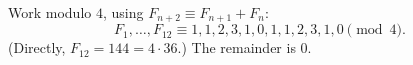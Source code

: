 Work modulo $4$, using $F_{n+2}\equiv F_{n+1}+F_n$:
\[
F_1,\dots,F_{12}\equiv 1,1,2,3,1,0,1,1,2,3,1,0 \pmod 4 .
\]
(Directly, $F_{12}=144=4\cdot36$.) The remainder is $\boxed{0}$.
